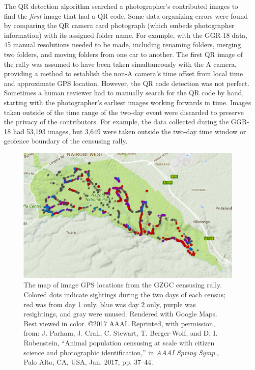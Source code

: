 The QR detection algorithm searched a photographer's contributed images to find the \textit{first} image that had a QR code.  Some data organizing errors were found by comparing the QR camera card photograph (which embeds photographer information) with its assigned folder name.  For example, with the GGR-18 data, 45 manual resolutions needed to be made, including renaming folders, merging two folders, and moving folders from one car to another.  The first QR image of the rally was assumed to have been taken simultaneously with the A camera, providing a method to establish the non-A camera's time offset from local time and approximate GPS location.  However, the QR code detection was not perfect.  Sometimes a human reviewer had to manually search for the QR code by hand, starting with the photographer's earliest images working forwards in time.  Images taken outside of the time range of the two-day event were discarded to preserve the privacy of the contributors.  For example, the data collected during the GGR-18 had 53,193 images, but 3,649 were taken outside the two-day time window or geofence boundary of the censusing rally.

\begin{figure}[!t]
    \begin{center}
        \includegraphics[width=0.9\linewidth]{resources/map-gzgc-all.pdf}
    \end{center}
    \caption{The map of image GPS locations from the GZGC censusing rally.  Colored dots indicate sightings during the two days of each census; red was from day 1 only, blue was day 2 only, purple was resightings, and gray were unused.  Rendered with Google Maps. Best viewed in color.  \copyright 2017 AAAI. Reprinted, with permission, from: J. Parham, J. Crall, C. Stewart, T. Berger-Wolf, and D. I. Rubenstein, ``Animal population censusing at scale with citizen science and photographic identification,'' in \textit{AAAI Spring Symp.}, Palo Alto, CA, USA, Jan. 2017, pp. 37–44.}
    \label{fig:maps-gzgc}
\end{figure}

